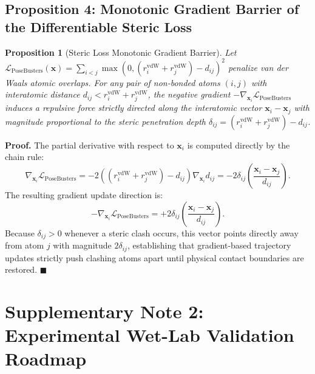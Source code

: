 \documentclass[11pt,a4paper]{article}
\newtheorem{proposition}{Proposition}
\begin{document}
\vspace{1em}

\subsection*{Proposition 4: Monotonic Gradient Barrier of the Differentiable Steric Loss}
\begin{proposition}[Steric Loss Monotonic Gradient Barrier]
Let $\mathcal{L}_{\text{PoseBusters}}(\mathbf{x}) = \sum_{i < j} \max\left(0, (r_i^{\text{vdW}} + r_j^{\text{vdW}}) - d_{ij}\right)^2$ penalize van der Waals atomic overlaps. For any pair of non-bonded atoms $(i, j)$ with interatomic distance $d_{ij} < r_i^{\text{vdW}} + r_j^{\text{vdW}}$, the negative gradient $-\nabla_{\mathbf{x}_i} \mathcal{L}_{\text{PoseBusters}}$ induces a repulsive force strictly directed along the interatomic vector $\mathbf{x}_i - \mathbf{x}_j$ with magnitude proportional to the steric penetration depth $\delta_{ij} = (r_i^{\text{vdW}} + r_j^{\text{vdW}}) - d_{ij}$.
\end{proposition}

\noindent\textbf{Proof.} The partial derivative with respect to $\mathbf{x}_i$ is computed directly by the chain rule:
\begin{equation}
\nabla_{\mathbf{x}_i} \mathcal{L}_{\text{PoseBusters}} = -2 \left( (r_i^{\text{vdW}} + r_j^{\text{vdW}}) - d_{ij} \right) \nabla_{\mathbf{x}_i} d_{ij} = -2 \delta_{ij} \left( \frac{\mathbf{x}_i - \mathbf{x}_j}{d_{ij}} \right).
\end{equation}
The resulting gradient update direction is:
\begin{equation}
-\nabla_{\mathbf{x}_i} \mathcal{L}_{\text{PoseBusters}} = +2 \delta_{ij} \left( \frac{\mathbf{x}_i - \mathbf{x}_j}{d_{ij}} \right).
\end{equation}
Because $\delta_{ij} > 0$ whenever a steric clash occurs, this vector points directly away from atom $j$ with magnitude $2\delta_{ij}$, establishing that gradient-based trajectory updates strictly push clashing atoms apart until physical contact boundaries are restored. \hfill $\blacksquare$

\newpage

\section*{Supplementary Note 2: Experimental Wet-Lab Validation Roadmap}
\end{document}
